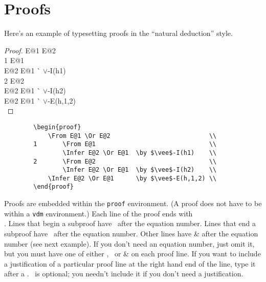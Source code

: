 {\section*{Proofs}

Here's an example of typesetting proofs in the ``natural deduction''
style. 

\begin{proof}
  \From E@1 \Or E@2 	\\
1   \From E@1	\\
    \Infer E@2 \Or E@1	\` $\vee$-I(h1) \\
2   \From E@2		\\
    \Infer E@2 \Or E@1	\` $\vee$-I(h2) \\
  \Infer E@2 \Or E@1	\` $\vee$-E(h,1,2)\\
\end{proof}
\begin{verbatim}
        \begin{proof}
            \From E@1 \Or E@2                           \\
        1       \From E@1                               \\
                \Infer E@2 \Or E@1  \by $\vee$-I(h1)    \\
        2       \From E@2                               \\
                \Infer E@2 \Or E@1  \by $\vee$-I(h2)    \\
            \Infer E@2 \Or E@1      \by $\vee$-E(h,1,2) \\
        \end{proof}
\end{verbatim}

Proofs are embedded within the {\tt proof} environment.  (A proof does
not have to be within a {\tt vdm} environment.)  Each line of the
proof ends with \cs\\.  Lines that begin a subproof
have \cs\From\ after the equation number.  Lines that end a
subproof have \cs\Infer\ after the equation number.  Other lines
have \cs\& after the equation number (see next example).  If you
don't need an equation number, just omit it,  but you must have one of
either \cs\From, \cs\Infer\ or \cs\& on each proof line.
If you want to include a justification of a particular proof line at
the right hand end of the line, type it after a \cs\by.  \cs\by\
is optional; you needn't include it if you don't need a justification.

}
